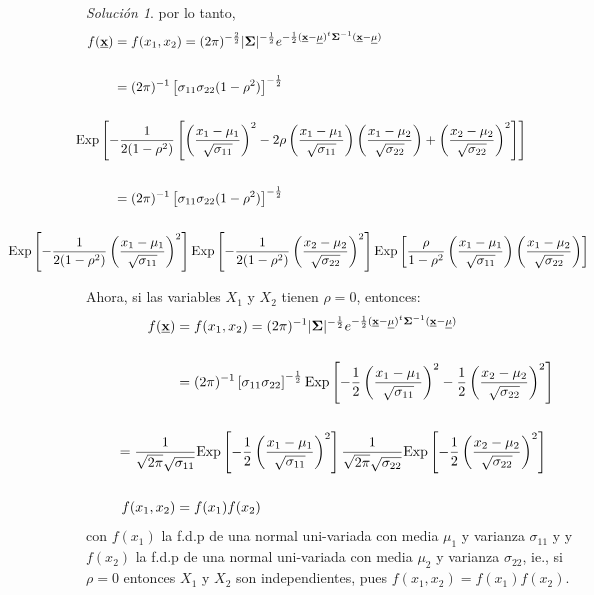 \documentclass[
]{book}
\theoremstyle{definition}
\theoremstyle{definition}
\theoremstyle{definition}
\theoremstyle{definition}
\theoremstyle{remark}
\newtheorem*{solution}{Solución}
\begin{document}
\begin{solution}
por lo tanto,
\begin{align*}
f(\underline{\mathbf{x}})&=f(x_1,x_2)=(2\pi)^{-\frac{2}{2}}|\mathbf{\Sigma}|^{-\frac{1}{2}}e^{-\frac{1}{2}(\underline{\mathbf{x}}-\underline{\mathbf{\mu}})^t\mathbf{\Sigma}^{-1}(\underline{\mathbf{x}}-\underline{\mathbf{\mu}})}\\
& \\
&=(2\pi)^{-1}\left[\sigma_{11}\sigma_{22}(1-\rho^2)\right]^{-\frac{1}{2}}\\
& \\ 
&\hspace{-1.0cm}\text{Exp}\left[-\frac{1}{2(1-\rho^2)}\left[\left(\frac{x_1-\mu_1}{\sqrt{\sigma_{11}}} \right)^2-2\rho \left(\frac{x_1-\mu_1}{\sqrt{\sigma_{11}}} \right)\left(\frac{x_1-\mu_2}{\sqrt{\sigma_{22}}} \right) +\left(\frac{x_2-\mu_2}{\sqrt{\sigma_{22}}} \right)^2 \right] \right]\\
&\\
&=(2\pi)^{-1}\left[\sigma_{11}\sigma_{22}(1-\rho^2)\right]^{-\frac{1}{2}}\\
& \\  
&\hspace{-2.8cm}\text{Exp}\left[-\frac{1}{2(1-\rho^2)}\left(\frac{x_1-\mu_1}{\sqrt{\sigma_{11}}} \right)^2\right]\text{Exp}\left[-\frac{1}{2(1-\rho^2)}\left(\frac{x_2-\mu_2}{\sqrt{\sigma_{22}}} \right)^2\right] \text{Exp}\left[ \frac{\rho}{1-\rho^2} \left(\frac{x_1-\mu_1}{\sqrt{\sigma_{11}}} \right)\left(\frac{x_1-\mu_2}{\sqrt{\sigma_{22}}} \right) \right] 
\end{align*}

Ahora, si las variables \(X_1\) y \(X_2\) tienen \(\rho=0\), entonces:
\begin{align*}
f(\underline{\mathbf{x}})&=f(x_1,x_2)=(2\pi)^{-1}|\mathbf{\Sigma}|^{-\frac{1}{2}}e^{-\frac{1}{2}(\underline{\mathbf{x}}-\underline{\mathbf{\mu}})^t\mathbf{\Sigma}^{-1}(\underline{\mathbf{x}}-\underline{\mathbf{\mu}})}\\
& \\
&=(2\pi)^{-1}\left[\sigma_{11}\sigma_{22}\right]^{-\frac{1}{2}}\text{Exp}\left[-\frac{1}{2} \left(\frac{x_1-\mu_1}{\sqrt{\sigma_{11}}} \right)^2 -\frac{1}{2}\left(\frac{x_2-\mu_2}{\sqrt{\sigma_{22}}} \right)^2 \right]\\
& \\
&\hspace{-1.5cm}=\frac{1}{\sqrt{2\pi}\sqrt{\sigma_{11}}}\text{Exp} \left[-\frac{1}{2} \left(\frac{x_1-\mu_1}{\sqrt{\sigma_{11}}} \right)^2 \right]\frac{1}{\sqrt{2\pi}\sqrt{\sigma_{22}}}\text{Exp} \left[-\frac{1}{2} \left(\frac{x_2-\mu_2}{\sqrt{\sigma_{22}}} \right)^2 \right]\\ \\ 
f(x_1,x_2)&=f(x_1)f(x_2)
\end{align*}
con \(f(x_1)\) la f.d.p de una normal uni-variada con media \(\mu_1\) y varianza \(\sigma_{11}\) y y \(f(x_2)\) la f.d.p de una normal uni-variada con media \(\mu_2\) y varianza \(\sigma_{22}\), ie., si \(\rho=0\) entonces \(X_1\) y \(X_2\) son independientes, pues \(f(x_1,x_2)=f(x_1)f(x_2)\).
\end{solution}
\end{document}
